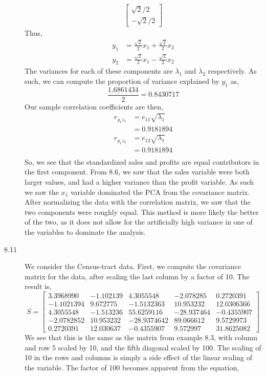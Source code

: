 \documentclass[letterpaper,10pt]{article}
\begin{document}
\begin{description}
\begin{align*}
\begin{bmatrix}
\sqrt{2}/2\\ -\sqrt{2}/2
\end{bmatrix}
\end{align*}
Thus,
\begin{align*}
y_1 &= \frac{\sqrt{2}}{2}x_1+\frac{\sqrt{2}}{2}x_2\\
y_2 &= \frac{\sqrt{2}}{2}x_1-\frac{\sqrt{2}}{2}x_2
\end{align*}
The variances for each of these components are $\lambda_1$ and $\lambda_2$ respectively. As such, we can compute the proportion of variance explained by $y_1$ as,
\[\frac{1.6861434}{2}=0.8430717\]
Our sample correlation coefficients are then,
\begin{align*}
r_{y_1z_1} &= e_{11}\sqrt{\lambda_1}\\
&=0.9181894\\
r_{y_1z_2} &= e_{12}\sqrt{\lambda_1}\\
&=0.9181894\\
\end{align*}
So, we see that the standardized sales and profits are equal contributors in the first component. From 8.6, we saw that the sales variable were both larger values, and had a higher variance than the profit variable. As such we saw the $x_1$ variable dominated the PCA from the covariance matrix. After normalizing the data with the correlation matrix, we saw that the two components were roughly equal. This method is more likely the better of the two, as it does not allow for the artificially high variance in one of the variables to dominate the analysis.
\item[8.11] We consider the Census-tract data. First, we compute the covariance matrix for the data, after scaling the last column by a factor of 10. The result is,
\[S=\begin{bmatrix}
3.3968990 &  -1.102139  &   4.3055548  &  -2.078285  &  0.2720391\\
-1.1021394  &  9.672775  &  -1.5132363  &  10.953232 &  12.0306366\\
4.3055548 &  -1.513236  &  55.6259116 &  -28.937464 &  -0.4355907\\
-2.0782852 &  10.953232  & -28.9374642   & 89.066612  &  9.5729973\\
0.2720391 &  12.030637  &  -0.4355907  &   9.572997 &  31.8625082
\end{bmatrix} \]
We see that this is the same as the matrix from example 8.3, with column and row 5 scaled by 10, and the fifth diagonal scaled by 100. The scaling of 10 in the rows and columns is simply a side effect of the linear scaling of the variable. The factor of 100 becomes apparent from the equation,

\end{description}
\end{document}
